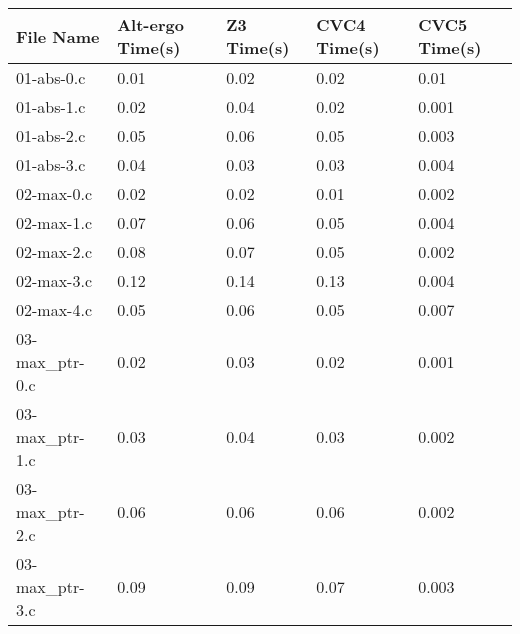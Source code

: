 \documentclass{article}
\begin{document}
\clearpage

\begin{table}[h]
\centering
\begin{tabular}{|l|l|l|l|l|}
\hline
\textbf{File Name}          & \textbf{Alt-ergo Time(s)} & \textbf{Z3 Time(s)} & \textbf{CVC4 Time(s)} & \textbf{CVC5 Time(s)} \\ \hline
01-abs-0.c                  & 0.01                     & 0.02                 & 0.02                   & 0.01                  \\ \hline
01-abs-1.c                  & 0.02                     & 0.04                 & 0.02                   & 0.001                 \\ \hline
01-abs-2.c                  & 0.05                     & 0.06                 & 0.05                   & 0.003                 \\ \hline
01-abs-3.c                  & 0.04                     & 0.03                 & 0.03                   & 0.004                 \\ \hline
02-max-0.c                  & 0.02                     & 0.02                 & 0.01                   & 0.002                 \\ \hline
02-max-1.c                  & 0.07                     & 0.06                 & 0.05                   & 0.004                 \\ \hline
02-max-2.c                  & 0.08                     & 0.07                 & 0.05                   & 0.002                 \\ \hline
02-max-3.c                  & 0.12                     & 0.14                 & 0.13                   & 0.004                 \\ \hline
02-max-4.c                  & 0.05                     & 0.06                 & 0.05                   & 0.007                 \\ \hline
03-max\_ptr-0.c              & 0.02                     & 0.03                 & 0.02                   & 0.001                 \\ \hline
03-max\_ptr-1.c              & 0.03                     & 0.04                 & 0.03                   & 0.002                 \\ \hline
03-max\_ptr-2.c              & 0.06                     & 0.06                 & 0.06                   & 0.002                 \\ \hline
03-max\_ptr-3.c              & 0.09                     & 0.09                 & 0.07                   & 0.003                 \\ \hline

\end{tabular}
\end{table}
\end{document}
